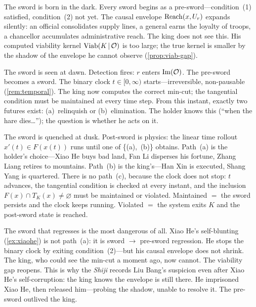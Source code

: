 \begin{remark}
\label{rem:binary-lifecycle-colour}
\textcolor{sword}{The sword is born in the dark.}
Every sword begins as a pre-sword---condition~(1) satisfied,
condition~(2) not yet.  The causal envelope
$\mathrm{Reach}(x, U_r)$ expands silently: an official
consolidates supply lines, a general earns the loyalty of
troops, a chancellor accumulates administrative reach.  The
king does not see this.  His computed viability kernel
$\mathrm{Viab}(K \,|\, \mathcal{O})$ is too large; the true kernel is smaller
by the shadow of the envelope he cannot observe
(\cref{prop:viab-gap}).

\textcolor{dao}{The sword is seen at dawn.}
Detection fires: $r$ enters $\mathrm{Im}(\mathcal{O})$.  The
pre-sword becomes a sword.  The binary clock
$t \in [0, \infty)$ starts---irreversible, non-pausable
(\cref{rem:temporal}).  The king now computes the correct
min-cut; the tangential condition must be maintained at
every time step.  From this instant, exactly two futures
exist: (a)~relinquish or (b)~elimination.  The holder
knows this (``when the hare dies\ldots''); the question is
whether he acts on it.

\textcolor{water}{The sword is quenched at dusk.}
Post-sword is physics: the linear time rollout $x'(t)
\in F(x(t))$ runs until one of \{(a),~(b)\} obtains.
Path~(a) is the holder's choice---Xiao He buys bad land,
Fan Li disperses his fortune, Zhang Liang retires to
mountains.  Path~(b) is the king's---Han Xin is executed,
Shang Yang is quartered.  There is no path~(c), because
the clock does not stop: $t$ advances, the tangential
condition is checked at every instant, and the inclusion
$F(x) \cap T_K(x) \neq \varnothing$ must be maintained
or violated.  Maintained $=$ the sword persists and the
clock keeps running.  Violated $=$ the system exits $K$
and the post-sword state is reached.

\textcolor{caution}{The sword that regresses is the most
dangerous of all.}  Xiao He's self-blunting
(\cref{ex:xiaohe}) is not path~(a): it is sword $\to$
pre-sword regression.  He stops the binary clock by exiting
condition~(2)---but his causal envelope does not shrink.
The king, who could see the min-cut a moment ago, now
cannot.  The viability gap reopens.  This is why the
\emph{Shiji} records Liu Bang's suspicion even after
Xiao He's self-corruption: the king knows the envelope is
still there.  He imprisoned Xiao He, then released
him---probing the shadow, unable to resolve it.  The
pre-sword outlived the king.
\end{remark}

